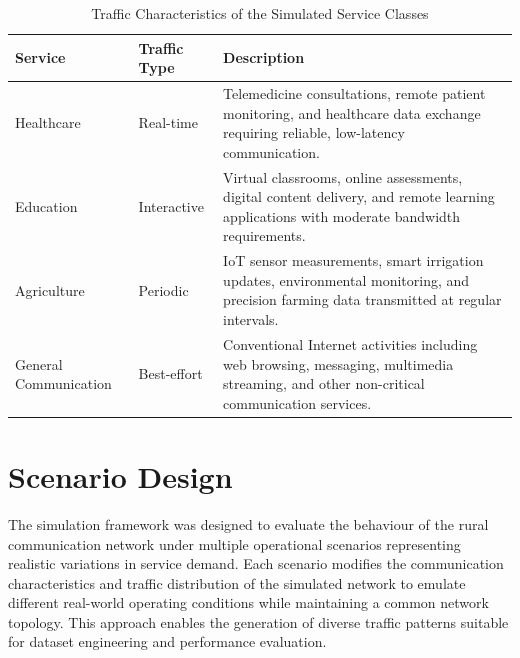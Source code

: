 \documentclass[12pt,a4paper]{report}
\begin{document}
	
	\begin{table}[H]
		\centering
		\caption{Traffic Characteristics of the Simulated Service Classes}
		\label{tab:traffic}
		
		\begin{tabular}{|p{4cm}|p{3cm}|p{8cm}|}
			\hline
			
			\textbf{Service} &
			\textbf{Traffic Type} &
			\textbf{Description}
			\\
			\hline
			
			Healthcare &
			Real-time &
			Telemedicine consultations, remote patient monitoring, and healthcare data exchange requiring reliable, low-latency communication.
			\\
			\hline
			
			Education &
			Interactive &
			Virtual classrooms, online assessments, digital content delivery, and remote learning applications with moderate bandwidth requirements.
			\\
			\hline
			
			Agriculture &
			Periodic &
			IoT sensor measurements, smart irrigation updates, environmental monitoring, and precision farming data transmitted at regular intervals.
			\\
			\hline
			
			General Communication &
			Best-effort &
			Conventional Internet activities including web browsing, messaging, multimedia streaming, and other non-critical communication services.
			\\
			\hline
			
		\end{tabular}
		
	\end{table}
	
	
	\section{Scenario Design}
	\label{sec:scenario_design}
	
	The simulation framework was designed to evaluate the behaviour of the rural communication network under multiple operational scenarios representing realistic variations in service demand. Each scenario modifies the communication characteristics and traffic distribution of the simulated network to emulate different real-world operating conditions while maintaining a common network topology. This approach enables the generation of diverse traffic patterns suitable for dataset engineering and performance evaluation.
	
\end{document}
